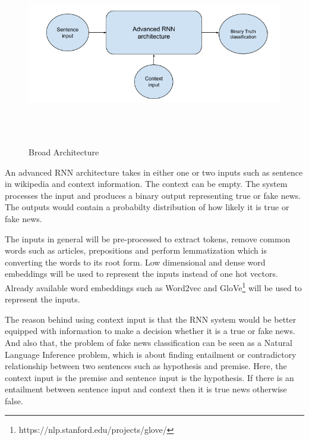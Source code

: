 \documentclass[a4paper, 11pt]{article}
\begin{document}
\begin{figure}[htpb]
    \centering
    \includegraphics[width=\textwidth,height=8cm,keepaspectratio=true]
    {broad-architecture-diagram.png}
    \caption{
        Broad Architecture
    }
    \label{fig:broad_architecture}
\end{figure}

An advanced RNN architecture takes in either one or two inputs such as sentence in wikipedia and context information. The context can be empty. The system processes the input and produces a binary output representing true or fake news. The outputs would contain a probabilty distribution of how likely it is true or fake news.

The inputs in general will be pre-processed to extract tokens, remove common words such as articles, prepositions and perform lemmatization which is converting the words to its root form. Low dimensional and dense word embeddings will be used to represent the inputs instead of one hot vectors. Already available word embeddings such as Word2vec\cite{Mikolov2013} and GloVe\footnote{https://nlp.stanford.edu/projects/glove/} will be used to represent the inputs.

The reason behind using context input is that the RNN system would be better equipped with information to make a decision whether it is a true or fake news. And also that, the problem of fake news classification can be seen as a Natural Language Inference \cite{Parikh2016} problem, which is about finding entailment or contradictory relationship between two sentences such as hypothesis and premise. Here, the context input is the premise and sentence input is the hypothesis. If there is an entailment between sentence input and context then it is true news otherwise false.
\end{document}
